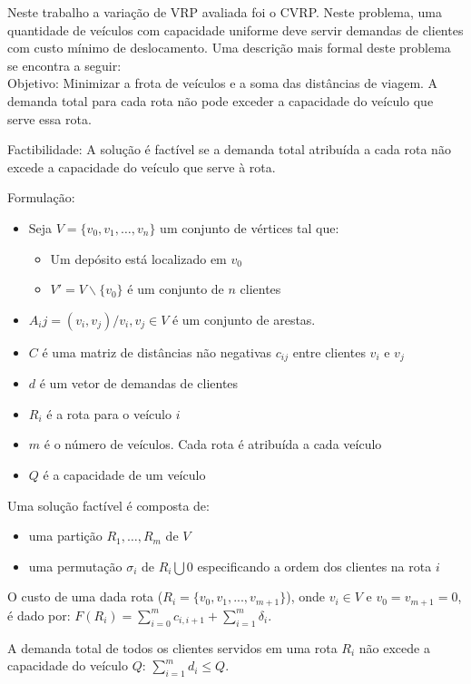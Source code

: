 \documentclass[conference]{IEEEtran}
\begin{document}
Neste trabalho a variação de VRP avaliada foi o CVRP. Neste problema, uma quantidade de veículos com capacidade uniforme deve servir demandas de clientes com custo mínimo de deslocamento. Uma descrição mais formal deste problema se encontra a seguir:\\

Objetivo: Minimizar a frota de veículos e a soma das distâncias de viagem. A demanda total para cada rota 
não pode exceder a capacidade do veículo que serve essa rota.

Factibilidade: A solução é factível se a demanda total atribuída a cada rota não excede a capacidade do veículo que serve à rota.

Formulação:
\begin{itemize}
    \item Seja $V = \{v_{0}, v_{1},\ldots , v_{n}\}$ um conjunto de vértices tal que:
    \begin{itemize}
    \item Um depósito está localizado em $v_{0}$
    \item $V' = V \backslash \{v_{0}\}$ é um conjunto de $n$ clientes
    \end{itemize}

\item $A_ij = {(v_i,v_j)/v_i,v_j \in V}$ é um conjunto de arestas.
\item $C$ é uma matriz de distâncias não negativas $c_{ij}$ entre clientes $v_i$ e $v_j$
\item $d$ é um vetor de demandas de clientes
\item $R_{i}$ é a rota para o veículo $i$
\item $m$ é o número de veículos. Cada rota é atribuída a cada veículo
\item $Q$ é a capacidade de um veículo
\end{itemize}

Uma solução factível é composta de:
\begin{itemize}
\item uma partição ${R_{1},\ldots ,R_{m}}$ de $V$
\item uma permutação $\sigma_{i}$ de $R_{i}\bigcup {0}$ especificando a ordem dos clientes na rota $i$
\end{itemize}

O custo de uma dada rota ($R_i = \{v_0,v_1,...,v_{m+1}\}$), onde $v_i \in V$ e $v_0 = v_{m+1} = 0$, é dado por: $F(R_{i})=\sum_{i=0}^{m} c_{i,i+1} + \sum_{i=1}^{m} \delta _{i}$. 

A demanda total de todos os clientes servidos em uma rota $R_{i}$ não excede a capacidade do veículo $Q$: $\sum_{i=1}^{m} d_{i} \leq Q$.
\end{document}
